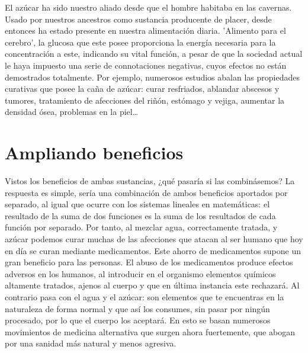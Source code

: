 \documentclass{article}
\begin{document}
	El azúcar ha sido nuestro aliado desde que el hombre habitaba en las cavernas. Usado por nuestros ancestros como sustancia producente de placer, desde entonces ha estado presente en nuestra alimentación diaria. 'Alimento para el cerebro', la glucosa que este posee proporciona la energía necesaria para la concentración a este, indicando su vital función, a pesar de que la sociedad actual le haya impuesto una serie de connotaciones negativas, cuyos efectos no están demostrados totalmente. 
	Por ejemplo, numerosos estudios abalan las propiedades curativas que posee la caña de azúcar: curar resfriados, ablandar abscesos y tumores, tratamiento de afecciones del riñón, estómago y vejiga, aumentar la densidad ósea, problemas en la piel\dots
	
\section{Ampliando beneficios}

	Vistos los beneficios de ambas sustancias, ¿qué pasaría si las combinásemos? La respuesta es simple, sería una combinación de ambos beneficios aportados por separado, al igual que ocurre con los sistemas lineales en matemáticas: el resultado de la suma de dos funciones es la suma de los resultados de cada función por separado. Por tanto, al mezclar agua, correctamente tratada, y azúcar podemos curar muchas de las afecciones que atacan al ser humano que hoy en día se curan mediante medicamentos. 
	Este ahorro de medicamentos supone un gran beneficio para las personas. El abuso de los medicamentos produce efectos adversos en los humanos, al introducir en el organismo elementos químicos altamente tratados, ajenos al cuerpo y que en última instancia este rechazará. Al contrario pasa con el agua y el azúcar: son elementos que te encuentras en la naturaleza de forma normal y que así los consumes, sin pasar por ningún procesado, por lo que el cuerpo los aceptará.
	En esto se basan numerosos movimientos de medicina alternativa que surgen ahora fuertemente, que abogan por una sanidad más natural y menos agresiva.
	

\end{document}
